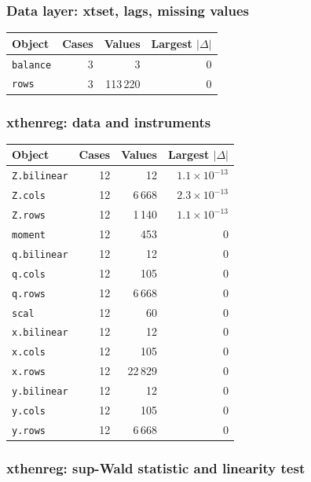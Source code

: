 \documentclass[
  10.5pt,
  a4paper,
]{article}
\begin{document}
\subsubsection*{Data layer: xtset, lags, missing values}

\begin{longtable}{@{}p{8.2cm}rrr@{}}
\toprule
Object & Cases & Values & Largest $|\Delta|$ \\
\midrule
\endhead
\texttt{balance} & 3 & 3 & 0 \\
\texttt{rows} & 3 & 113\,220 & 0 \\
\bottomrule
\end{longtable}

\subsubsection*{xthenreg: data and instruments}

\begin{longtable}{@{}p{8.2cm}rrr@{}}
\toprule
Object & Cases & Values & Largest $|\Delta|$ \\
\midrule
\endhead
\texttt{Z.bilinear} & 12 & 12 & $1.1\times10^{-13}$ \\
\texttt{Z.cols} & 12 & 6\,668 & $2.3\times10^{-13}$ \\
\texttt{Z.rows} & 12 & 1\,140 & $1.1\times10^{-13}$ \\
\texttt{moment} & 12 & 453 & 0 \\
\texttt{q.bilinear} & 12 & 12 & 0 \\
\texttt{q.cols} & 12 & 105 & 0 \\
\texttt{q.rows} & 12 & 6\,668 & 0 \\
\texttt{scal} & 12 & 60 & 0 \\
\texttt{x.bilinear} & 12 & 12 & 0 \\
\texttt{x.cols} & 12 & 105 & 0 \\
\texttt{x.rows} & 12 & 22\,829 & 0 \\
\texttt{y.bilinear} & 12 & 12 & 0 \\
\texttt{y.cols} & 12 & 105 & 0 \\
\texttt{y.rows} & 12 & 6\,668 & 0 \\
\bottomrule
\end{longtable}

\subsubsection*{xthenreg: sup-Wald statistic and linearity test}
\end{document}
